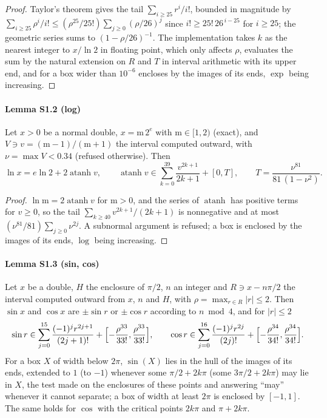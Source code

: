\documentclass[preprint,11pt,a4paper]{elsarticle}
\theoremstyle{definition}
\begin{document}
\begin{proof}
Taylor's theorem gives the tail $\sum_{i\ge25}r^i/i!$, bounded in magnitude by $\sum_{i\ge25}\rho^i/i!\le(\rho^{25}/25!)\sum_{j\ge0}(\rho/26)^j$ since $i!\ge25!\,26^{\,i-25}$ for $i\ge25$; the geometric series sums to $(1-\rho/26)^{-1}$. The implementation takes $k$ as the nearest integer to $x/\ln2$ in floating point, which only affects $\rho$, evaluates the sum by the natural extension on $R$ and $T$ in interval arithmetic with its upper end, and for a box wider than $10^{-6}$ encloses by the images of its ends, $\exp$ being increasing.
\end{proof}

\paragraph{Lemma S1.2 (log)}
Let $x>0$ be a normal double, $x=\mathrm{m}\,2^{e}$ with $\mathrm{m}\in[1,2)$ (exact), and $V\ni v=(\mathrm{m}-1)/(\mathrm{m}+1)$ the interval computed outward, with $\nu=\max V<0.34$ (refused otherwise). Then
\[
\ln x=e\ln2+2\operatorname{atanh}v,\qquad \operatorname{atanh}v\in\sum_{k=0}^{39}\frac{v^{2k+1}}{2k+1}+[0,T],\qquad T=\frac{\nu^{81}}{81\,(1-\nu^{2})}.
\]

\begin{proof}
$\ln\mathrm{m}=2\operatorname{atanh}v$ for $\mathrm{m}>0$, and the series of $\operatorname{atanh}$ has positive terms for $v\ge0$, so the tail $\sum_{k\ge40}v^{2k+1}/(2k+1)$ is nonnegative and at most $(\nu^{81}/81)\sum_{j\ge0}\nu^{2j}$. A subnormal argument is refused; a box is enclosed by the images of its ends, $\log$ being increasing.
\end{proof}

\paragraph{Lemma S1.3 (sin, cos)}
Let $x$ be a double, $H$ the enclosure of $\pi/2$, $n$ an integer and $R\ni x-n\pi/2$ the interval computed outward from $x$, $n$ and $H$, with $\rho=\max_{r\in R}|r|\le2$. Then $\sin x$ and $\cos x$ are $\pm\sin r$ or $\pm\cos r$ according to $n\bmod4$, and for $|r|\le2$
\[
\sin r\in\sum_{j=0}^{15}\frac{(-1)^{j}r^{2j+1}}{(2j+1)!}+\Bigl[-\frac{\rho^{33}}{33!},\frac{\rho^{33}}{33!}\Bigr],\qquad
\cos r\in\sum_{j=0}^{16}\frac{(-1)^{j}r^{2j}}{(2j)!}+\Bigl[-\frac{\rho^{34}}{34!},\frac{\rho^{34}}{34!}\Bigr].
\]
For a box $X$ of width below $2\pi$, $\sin(X)$ lies in the hull of the images of its ends, extended to $1$ (to $-1$) whenever some $\pi/2+2k\pi$ (some $3\pi/2+2k\pi$) may lie in $X$, the test made on the enclosures of these points and answering ``may'' whenever it cannot separate; a box of width at least $2\pi$ is enclosed by $[-1,1]$. The same holds for $\cos$ with the critical points $2k\pi$ and $\pi+2k\pi$.
\end{document}
